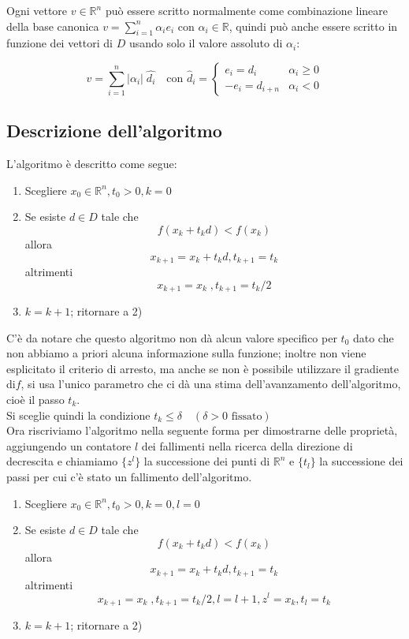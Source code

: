 Ogni vettore $v \in \mathbb{R}^n$ può essere scritto normalmente come
combinazione lineare della base canonica $v = \displaystyle
\sum_{i=1}^{n} \alpha_{i} e_{i}$ con $\alpha_i \in \mathbb{R}$, quindi
può anche essere scritto in funzione dei vettori di $D$ usando solo il
valore assoluto di $\alpha_i$:

$$ 
v = \displaystyle \sum_{i=1}^{n} |\alpha_i| \; \hat{d_i} \quad
\text{con } \hat d_i = \left\{
\begin{array}{ll} e_i = d_i & \alpha_i \geq 0 \\ -e_i = d_{i+n} &
\alpha_i < 0
\end{array} \right.
$$
\subsection{Descrizione dell'algoritmo} L'algoritmo \`e descritto come
segue:
\begin{enumerate}
 \item Scegliere $x_{0} \in \mathbb{R}^{n}, t_0 > 0, k=0$
 \item Se esiste $d \in D$ tale che
  $$f(x_{k} + t_kd) < f(x_{k})$$
 allora
 $$ x_{k+1} = x_{k} + t_k d, t_{k+1} = t_k $$
 altrimenti
 $$x_{k+1} = x_{k}\; , t_{k+1} = t_k/2 $$
\item $k= k+1$; ritornare a 2)
\end{enumerate}

C'\`e da notare che questo algoritmo non d\`a alcun valore specifico per
$t_0$ dato che non abbiamo a priori alcuna informazione sulla
funzione; inoltre non viene esplicitato il criterio di arresto, ma
anche se non \`e possibile utilizzare il gradiente di$f$, si usa l'unico
parametro che ci d\`a una stima dell'avanzamento dell'algoritmo, cio\`e il
passo $t_k$.\\ Si sceglie quindi la condizione $t_k \leq \delta \quad
(\delta > 0 \text{ fissato})$ \\

Ora riscriviamo l'algoritmo nella seguente forma per dimostrarne delle
propriet\`a, aggiungendo un contatore $l$ dei fallimenti nella ricerca
della direzione di decrescita e chiamiamo $ \{ z^{l} \}$ la
successione dei punti di $\mathbb{R}^{n}$ e $\{ t_{l} \}$ la
successione dei passi per cui c'\`e stato un fallimento
dell'algoritmo.\\
 
\begin{enumerate}
 \item Scegliere $x_{0} \in \mathbb{R}^{n}, t_0 > 0, k=0, l=0$
 \item Se esiste $d \in D$ tale che
  $$f(x_{k} + t_kd) < f(x_{k})$$
 allora
 $$ x_{k+1} = x_{k} + t_k d, t_{k+1} = t_k $$
 altrimenti
 $$x_{k+1} = x_{k}\; , t_{k+1} = t_k/2, l=l+1, z^{l} = x_{k}, t_l = t_k$$
\item $k= k+1$; ritornare a 2)
\end{enumerate}

